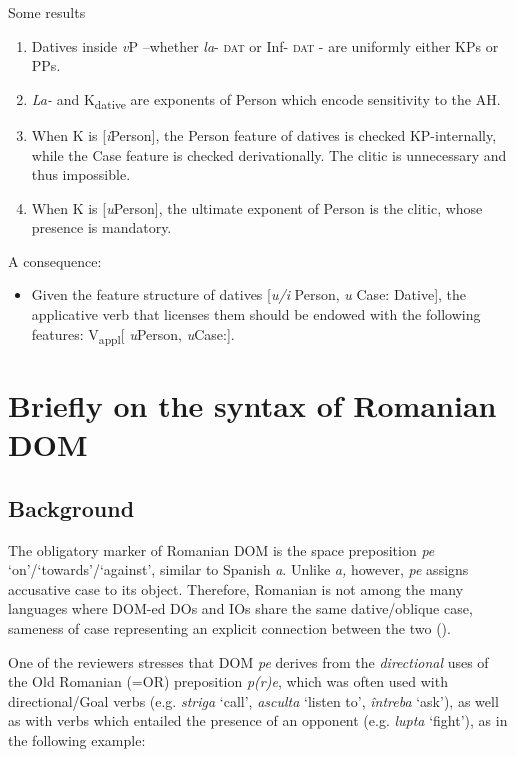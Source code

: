 \documentclass[output=paper,colorlinks,citecolor=brown,nonflat]{langsci/langscibook}
\begin{document}
 {Some} {results}
\begin{enumerate}
	\item Datives inside \textit{v}P –whether \textit{la}{}- \textsc{dat} or Inf- \textsc{dat} - are uniformly either KPs or PPs.
	\item \textit{La-} and K\textsubscript{dative} are exponents of Person which encode sensitivity to the AH.
	\item When K is [\textit{i}Person], the Person feature of datives is checked KP-internally, while the Case feature is checked derivationally. The clitic is unnecessary and thus impossible.
	\item When K is [\textit{u}Person], the ultimate exponent of Person is the clitic, whose presence is mandatory.
\end{enumerate}

 A consequence:
 \begin{itemize}
	\item Given the feature structure of datives [\textit{u/i} Person, \textit{u} Case: Dative], the applicative verb that licenses them should be endowed with the following features: V\textsubscript{appl}[ \textit{u}Person, \textit{u}Case:{\longrule}].
\end{itemize}

\section{Briefly on the syntax of Romanian DOM} %

\subsection{{Background}}

The obligatory marker of Romanian DOM is the space preposition \textit{pe} ‘on’/‘towards’/‘against’, similar to Spanish \textit{a}. Unlike \textit{a,} however, \textit{pe} assigns accusative case to its object. Therefore, Romanian is not among the many languages where DOM-ed DOs and IOs share the same dative/oblique case, sameness of case representing an explicit connection between the two (\citealt{ManziniFranco2016}).

One of the reviewers stresses that DOM \textit{pe} derives from the \textit{directional} uses of the Old Romanian (=OR) preposition \textit{p(r)e}, which was often used with directional/Goal verbs (e.g. \textit{striga} ‘call’, \textit{asculta} ‘listen to’, \textit{întreba} ‘ask’), as well as with verbs which entailed the presence of an opponent (e.g. \textit{lupta} ‘fight’), as in the following example:
\end{document}
